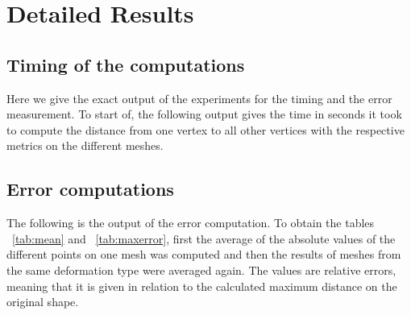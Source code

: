 \chapter{Detailed Results}
\label{chapter:DetailedResults}
\section{Timing of the computations}
Here we give the exact output of the experiments for the timing and the error measurement.
To start of, the following output gives the time in seconds it took to compute the distance from one vertex to all other vertices with the respective metrics on the different meshes.


\section{Error computations}
The following is the output of the error computation.
To obtain the tables ~\ref{tab:mean} and ~\ref{tab:maxerror}, first the average of the absolute values of the different points on one mesh was computed and then the results of meshes from the same deformation type were averaged again.
The values are relative errors, meaning that it is given in relation to the calculated maximum distance on the original shape.

